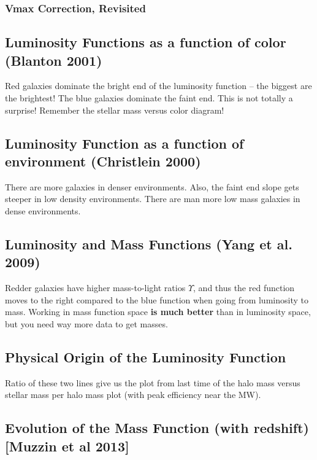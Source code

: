 \documentclass{article}
\begin{document}
\subsubsection{Vmax Correction, Revisited}

\subsection{Luminosity Functions as a function of color (Blanton 2001)}

Red galaxies dominate the bright end of the luminosity function -- the biggest are the brightest! The blue galaxies dominate the faint end. This is not totally a surprise! Remember the stellar mass versus color diagram! 

\subsection{Luminosity Function as a function of environment (Christlein 2000)}

There are more galaxies in denser environments. Also, the faint end slope gets steeper in low density environments. There are man more low mass galaxies in dense environments. 

\subsection{Luminosity and Mass Functions (Yang et al. 2009)}

Redder galaxies have higher mass-to-light ratios $\Upsilon$, and thus the red function moves to the right compared to the blue function when going from luminosity to mass. Working in mass function space \textbf{is much better} than in luminosity space, but you need way more data to get masses. 

\subsection{Physical Origin of the Luminosity Function}

Ratio of these two lines give us the plot from last time of the halo mass versus stellar mass per halo mass plot (with peak efficiency near the MW). 

\subsection{Evolution of the Mass Function (with redshift) [Muzzin et al 2013]}
\end{document}

